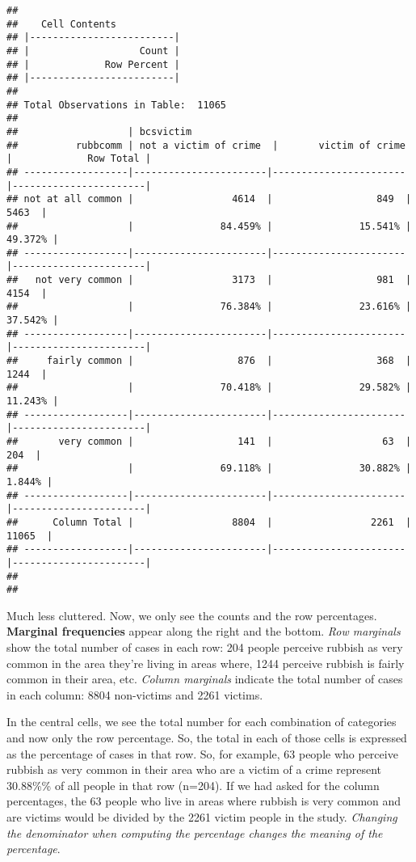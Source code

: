 \documentclass[
]{book}
\begin{document}
\begin{verbatim}
## 
##    Cell Contents
## |-------------------------|
## |                   Count |
## |             Row Percent |
## |-------------------------|
## 
## Total Observations in Table:  11065 
## 
##                   | bcsvictim 
##          rubbcomm | not a victim of crime  |       victim of crime  |             Row Total | 
## ------------------|-----------------------|-----------------------|-----------------------|
## not at all common |                 4614  |                  849  |                 5463  | 
##                   |               84.459% |               15.541% |               49.372% | 
## ------------------|-----------------------|-----------------------|-----------------------|
##   not very common |                 3173  |                  981  |                 4154  | 
##                   |               76.384% |               23.616% |               37.542% | 
## ------------------|-----------------------|-----------------------|-----------------------|
##     fairly common |                  876  |                  368  |                 1244  | 
##                   |               70.418% |               29.582% |               11.243% | 
## ------------------|-----------------------|-----------------------|-----------------------|
##       very common |                  141  |                   63  |                  204  | 
##                   |               69.118% |               30.882% |                1.844% | 
## ------------------|-----------------------|-----------------------|-----------------------|
##      Column Total |                 8804  |                 2261  |                11065  | 
## ------------------|-----------------------|-----------------------|-----------------------|
## 
## 
\end{verbatim}

Much less cluttered. Now, we only see the counts and the row percentages. \textbf{Marginal frequencies} appear along the right and the bottom. \emph{Row marginals} show the total number of cases in each row: 204 people perceive rubbish as very common in the area they're living in areas where, 1244 perceive rubbish is fairly common in their area, etc. \emph{Column marginals} indicate the total number of cases in each column: 8804 non-victims and 2261 victims.

In the central cells, we see the total number for each combination of categories and now only the row percentage. So, the total in each of those cells is expressed as the percentage of cases in that row. So, for example, 63 people who perceive rubbish as very common in their area who are a victim of a crime represent 30.88\%\% of all people in that row (n=204). If we had asked for the column percentages, the 63 people who live in areas where rubbish is very common and are victims would be divided by the 2261 victim people in the study. \emph{Changing the denominator when computing the percentage changes the meaning of the percentage}.
\end{document}
